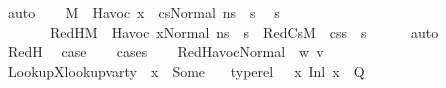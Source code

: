 \begin{isabellebody}
\ auto\isanewline
\ \ \isamarkupfalse%
\ {\isacartoucheopen}M{\isacharcomma}{\kern0pt}{\isasymLambda}{\isacharcomma}{\kern0pt}{\isasymGamma}{\isacharcomma}{\kern0pt}{\isasymOmega}\ {\isasymturnstile}\ {\isasymlangle}Havoc\ x\ {\isacharhash}{\kern0pt}\ cs{}{\isacharcomma}{\kern0pt}Normal\ ns{\isasymrangle}\ {\isacharbrackleft}{\kern0pt}{\isasymrightarrow}{\isacharbrackright}{\kern0pt}\ s{\isacharprime}{\kern0pt}{\isacartoucheclose}\ \isamarkupfalse%
\ s{\isacharprime}{\kern0pt}{\isacharprime}{\kern0pt}\ \isanewline
\ \ \ \ \ \ \ RedH{\isacharcolon}{\kern0pt}{\isachardoublequoteopen}M{\isacharcomma}{\kern0pt}{\isasymLambda}{\isacharcomma}{\kern0pt}{\isasymGamma}{\isacharcomma}{\kern0pt}{\isasymOmega}\ {\isasymturnstile}\ {\isasymlangle}Havoc\ x{\isacharcomma}{\kern0pt}Normal\ ns{\isasymrangle}\ {\isasymrightarrow}\ s{\isacharprime}{\kern0pt}{\isacharprime}{\kern0pt}{\isachardoublequoteclose}\ \ RedCs{}{\isacharcolon}{\kern0pt}{\isachardoublequoteopen}M{\isacharcomma}{\kern0pt}{\isasymLambda}{\isacharcomma}{\kern0pt}{\isasymGamma}{\isacharcomma}{\kern0pt}{\isasymOmega}\ {\isasymturnstile}\ {\isasymlangle}cs{}{\isacharcomma}{\kern0pt}s{\isacharprime}{\kern0pt}{\isacharprime}{\kern0pt}{\isasymrangle}\ {\isacharbrackleft}{\kern0pt}{\isasymrightarrow}{\isacharbrackright}{\kern0pt}\ s{\isacharprime}{\kern0pt}{\isachardoublequoteclose}\isanewline
\ \ \ \ \isamarkupfalse%
\ auto\isanewline
\ \ \isamarkupfalse%
\ RedH\ \isamarkupfalse%
\ {\isacharquery}{\kern0pt}case\isanewline
\ \ \isamarkupfalse%
\ cases\isanewline
\ \ \isamarkupfalse%
\ {\isacharparenleft}{\kern0pt}RedHavocNormal\ {\isasymtau}\ w\ v{\isacharparenright}{\kern0pt}\isanewline
\ \ \ \ \isamarkupfalse%
\ LookupX{\isacharprime}{\kern0pt}{\isacharcolon}{\kern0pt}{\isachardoublequoteopen}lookup{\isacharunderscore}{\kern0pt}var{\isacharunderscore}{\kern0pt}ty\ {\isasymLambda}{\isacharprime}{\kern0pt}\ x{\isacharprime}{\kern0pt}\ {\isacharequal}{\kern0pt}\ Some\ {\isasymtau}{\isachardoublequoteclose}\ \isamarkupfalse%
\ {\isacartoucheopen}type{\isacharunderscore}{\kern0pt}rel\ {\isasymLambda}\ {\isasymLambda}{\isacharprime}{\kern0pt}\ {\isacharparenleft}{\kern0pt}{\isacharparenleft}{\kern0pt}x{\isacharcomma}{\kern0pt}\ {\isacharparenleft}{\kern0pt}Inl\ x{\isacharprime}{\kern0pt}{\isacharparenright}{\kern0pt}{\isacharparenright}{\kern0pt}\ {\isacharhash}{\kern0pt}\ Q{\isacharparenright}{\kern0pt}{\isacartoucheclose}\isanewline

\end{isabellebody}
